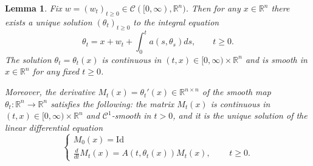\documentclass[12pt,a4paper]{article}
\newcommand{\RR}{\mathbb{R}}
\newcommand{\R}{\mathbb{R}}
\newcommand{\id}{\mathrm{Id}}
\newcommand{\cC}{\mathcal C}
\newtheorem{lemma}[theorem]{Lemma}
\theoremstyle{definition}
\begin{document}
\begin{lemma} \label{lem_1800}
Fix $w = (w_t)_{t \geq 0} \in \cC([0, \infty), \RR^n)$. Then
for any $x\in \R^n$ there exists a unique solution
$(\theta_t)_{t \geq 0}$ to the integral equation
\begin{equation}
\theta_t = x + w_t + \int_0^t a(s,  \theta_s) ds ,
\qquad t \geq 0.
\label{eq_1801} \end{equation}
The solution $\theta_t = \theta_t (x)$ is continuous in $(t,x) \in [0, \infty) \times \RR^n$
and is smooth in $x \in \RR^n$ for any fixed $t \geq 0$. 

\medskip Moreover, the derivative $M_t (x) = \theta_t'(x) \in \RR^{n \times n}$
of the smooth map $\theta_t: \RR^n \rightarrow \RR^n$ satisfies the following: the matrix $M_t(x)$ is continuous
in $(t,x) \in [0, \infty) \times \RR^n$ and $\mathcal C^1$-smooth in $t > 0$, and it is the unique solution of the
linear differential equation
\begin{equation} \label{eq_1802}
\begin{cases}
M_0 (x) = \id \\
\frac d{dt} M_t(x) = A(t,\theta_t(x)) M_t(x),  & \phantom{abc}t\geq 0.
\end{cases}
\end{equation}
\end{lemma}
%
\end{document}
